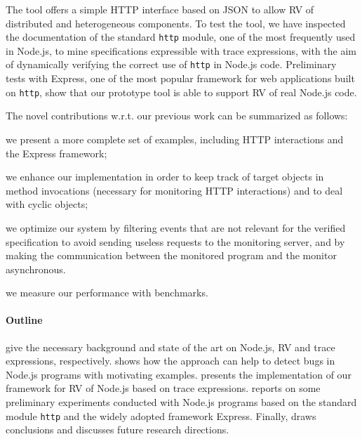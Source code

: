 The tool offers a simple HTTP interface based on JSON to allow RV of
distributed and heterogeneous components.
%
To test the tool, we have inspected the documentation of the standard \lstinline{http} module, one of the most frequently used
in Node.js, to mine specifications expressible with trace expressions, with the aim of dynamically verifying
the correct use of \lstinline{http} in Node.js code.
Preliminary tests with Express, one of the most popular framework for web applications built on \lstinline{http}, show
that our prototype tool is able to support RV of real Node.js code.

The novel contributions w.r.t. our previous work \cite{TowardsIoT17} can be summarized as follows:
\begin{enumerate*}[label=(\alph*)]
	\item we present a more complete set of examples, including HTTP interactions and the Express framework;
	\item we enhance our implementation in order to keep track of target objects in method invocations (necessary for monitoring HTTP interactions) and to deal with cyclic objects;
	\item we optimize our system by filtering events that are not relevant for the verified specification to avoid sending useless requests to the monitoring server, and by making the communication between the monitored program and the monitor asynchronous.
	\item we measure our performance with benchmarks.
\end{enumerate*}

\paragraph{Outline}
 give the necessary background and state of the art on Node.js, RV and trace expressions, respectively.
 shows how the approach can help to detect bugs in Node.js programs with motivating examples.
 presents the implementation of our framework for RV of Node.js based on trace expressions.
 reports on some preliminary experiments conducted with Node.js programs based on the standard module
\lstinline{http} and the widely adopted framework Express.
Finally,  draws conclusions and discusses future research directions.
